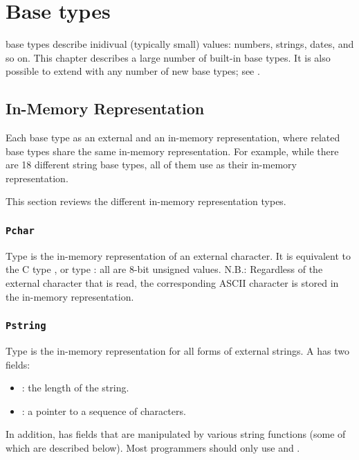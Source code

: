 \chapter{Base types}
\label{chap:base-types}
\PADSL{} base types describe inidivual (typically small) values: numbers, strings, dates, and so on.
This chapter describes a large number of built-in \PADSL{} base types.
It is also possible to extend \PADSL{} with any
number of new base types; see .

\section{In-Memory Representation}
\label{sec:base-types-rep}

Each base type as an external and an in-memory representation, where
related base types share the same in-memory representation.  For
example, while there are 18 different string base types, all of them
use  as their in-memory representation.

This section reviews the different in-memory representation types.

\subsection{{\tt Pchar}}

Type  is the in-memory representation of an external
character.  It is equivalent to the C type , or type
: all are 8-bit unsigned values.  N.B.: Regardless of the
external character that is read, the corresponding ASCII character is stored in 
the in-memory representation.

\subsection{{\tt Pstring}}

Type  is the in-memory representation for all forms of
external strings.  A   has two fields:
\begin{itemize}
\item {} : the length of the string.
\item {} : a pointer to a sequence of  characters.
\end{itemize}
In addition,  has fields that are manipulated
by various string functions (some of which are described below).
Most programmers should only use  and .

